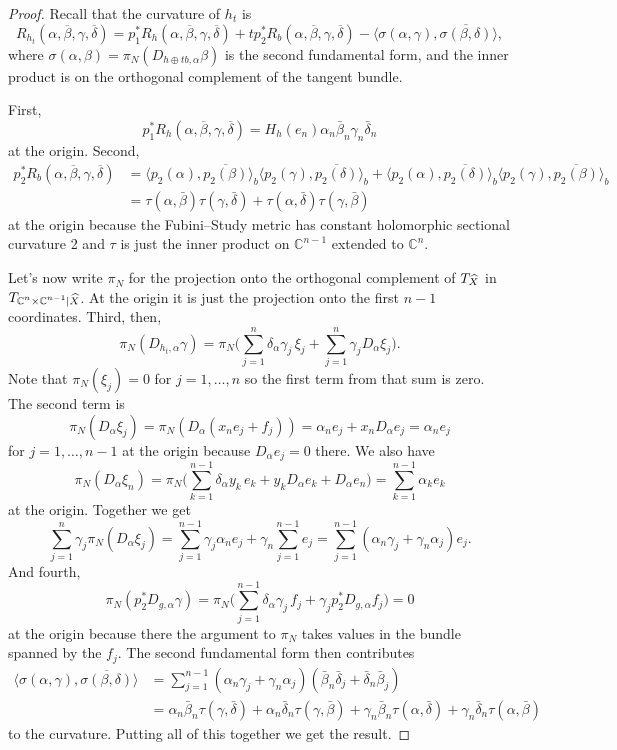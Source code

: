 \documentclass[10pt,a4paper]{amsart}
\newcommand{\kk}[1]{\mathbb{#1}}
\def\<{\langle}
\def\>{\rangle}
\def\fs{b}
\def\ton{\alpha}
\def\ttw{\beta}
\def\tth{\gamma}
\def\tfo{\delta}
\def\ov#1{\overline{#1}}
\def\hsc{holomorphic sectional curvature}
\def\bl#1{\widehat{#1}}
\def\blX{\bl{X}}
\begin{document}
\begin{proof}
Recall that the curvature of $h_t$ is
$$
R_{h_t}(\alpha, \ov\beta, \gamma, \ov\delta)
= p_1^* R_h(\alpha, \ov\beta, \gamma, \ov\delta)
+ t p_2^* R_b(\alpha, \ov\beta, \gamma, \ov\delta)
- \<\sigma(\alpha, \gamma), \ov{\sigma(\beta, \delta)}\>,
$$
where $\sigma(\alpha, \beta) = \pi_N(D_{h \oplus t \fs,\alpha} \beta)$ is
the second fundamental form, and the inner product is on the orthogonal complement
of the tangent bundle.

First,
$$
p_1^*R_h(\alpha, \ov\beta, \gamma, \ov\delta)
= H_h(e_n) \ton_n \bar \ttw_n \tth_n \bar \tfo_n
$$
at the origin. Second,
\begin{align*}
p_2^*R_b(\alpha, \ov\beta, \gamma, \ov\delta)
&= \< p_2(\alpha), \ov{p_2(\beta)} \>_b
\< p_2(\gamma), \ov{p_2(\delta)} \>_b
+ \< p_2(\alpha), \ov{p_2(\delta)} \>_b
\< p_2(\gamma), \ov{p_2(\beta)} \>_b
\\
&= \tau(\ton, \bar \ttw) \tau(\tth, \bar \tfo) + \tau(\ton, \bar \tfo) \tau(\tth, \bar \ttw)
\end{align*}
at the origin
because the Fubini--Study metric has constant \hsc{} 2
and $\tau$ is just the inner product on $\kk C^{n-1}$ extended to $\kk C^n$.

Let's now write $\pi_N$ for the projection onto the orthogonal complement of
$T_{\smash{\blX}}$ in $T_{\smash{\kk C^n \times \kk C^{n-1}|\blX}}$.
At the origin it is just the projection onto the first $n-1$ coordinates.
Third, then,
$$
\pi_N(D_{h_t,\alpha} \gamma)
= \pi_N\biggl(
\sum_{j=1}^{n} \tfo_{\alpha} \tth_j \, \xi_j
+ \sum_{j=1}^n \tth_j D_{\alpha} \xi_j
\biggr).
$$
Note that $\pi_N(\xi_j) = 0$ for $j=1,\ldots,n$ so the first term from that sum
is zero. The second term is
$$
\pi_N(D_{\alpha} \xi_j)
= \pi_N(D_{\alpha}(x_n e_j + f_j))
= \ton_n e_j + x_n D_{\alpha} e_j
= \ton_n e_j
$$
for $j=1,\ldots,n-1$ at the origin because $D_{\alpha} e_j = 0$ there.
We also have
$$
\pi_N(D_{\alpha} \xi_n)
= \pi_N\biggl(
\sum_{k=1}^{n-1} \tfo_{\alpha} y_k \, e_k + y_k D_{\alpha} e_k
+ D_{\alpha} e_n
\biggr)
= \sum_{k=1}^{n-1} \ton_k e_k
$$
at the origin.
Together we get
$$
\sum_{j=1}^n \tth_j \pi_N(D_{\alpha} \xi_j)
= \sum_{j=1}^{n-1} \tth_j \ton_n e_j + \tth_n \sum_{j=1}^{n-1} e_j
= \sum_{j=1}^{n-1} (\ton_n \tth_j + \tth_n \ton_j) e_j.
$$
And fourth,
$$
\pi_N(p_2^*D_{g,\alpha} \gamma)
= \pi_N \biggl(
\sum_{j=1}^{n-1} \tfo_\alpha \tth_j \, f_j
+ \tth_j p_2^*D_{g,\alpha} f_j \biggr) = 0
$$
at the origin because there the argument to $\pi_N$ takes values in the bundle
spanned by the $f_j$.
The second fundamental form then contributes
\begin{align*}
\<\sigma(\alpha, \gamma), \ov{\sigma(\beta, \delta)}\>
&=
\sum_{j=1}^{n-1} (\ton_n \tth_j + \tth_n \ton_j) (\bar \ttw_n \bar \tfo_j + \bar \tfo_n \bar \ttw_j)
\\
&= \ton_n \bar \ttw_n \tau(\tth, \bar \tfo)
+ \ton_n \bar \tfo_n \tau(\tth, \bar \ttw)
+ \tth_n \bar \ttw_n \tau(\ton, \bar \tfo)
+ \tth_n \bar \tfo_n \tau(\ton, \bar \ttw)
\end{align*}
to the curvature. Putting all of this together we get the result.
\end{proof}
\end{document}
